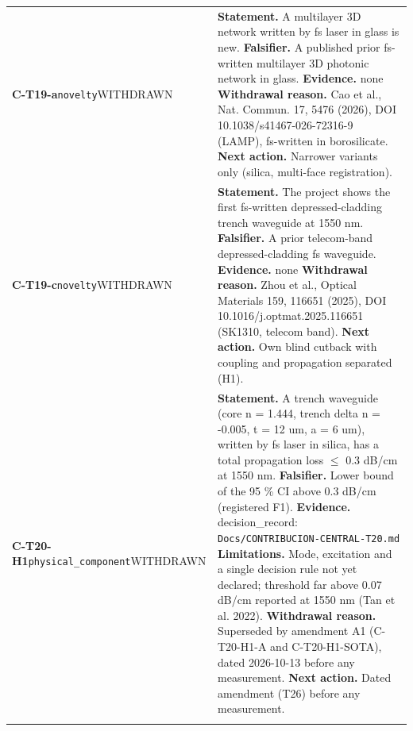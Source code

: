 \begin{longtable}{@{}>{\raggedright\arraybackslash}p{2.35cm}>{\raggedright\arraybackslash}p{13.2cm}@{}}
\textbf{C-T19-a}\newline \texttt{novelty}\newline WITHDRAWN & \textbf{Statement.} A multilayer 3D network written by fs laser in glass is new. \newline \textbf{Falsifier.} A published prior fs-written multilayer 3D photonic network in glass. \newline \textbf{Evidence.} none \newline \textbf{Withdrawal reason.} Cao et al., Nat. Commun. 17, 5476 (2026), DOI 10.1038/\allowbreak{}s41467-026-72316-9 (LAMP), fs-written in borosilicate. \newline \textbf{Next action.} Narrower variants only (silica, multi-face registration). \\ \addlinespace[2pt]
\textbf{C-T19-c}\newline \texttt{novelty}\newline WITHDRAWN & \textbf{Statement.} The project shows the first fs-written depressed-cladding trench waveguide at 1550 nm. \newline \textbf{Falsifier.} A prior telecom-band depressed-cladding fs waveguide. \newline \textbf{Evidence.} none \newline \textbf{Withdrawal reason.} Zhou et al., Optical Materials 159, 116651 (2025), DOI 10.1016/\allowbreak{}j.optmat.2025.116651 (SK1310, telecom band). \newline \textbf{Next action.} Own blind cutback with coupling and propagation separated (H1). \\ \addlinespace[2pt]
\textbf{C-T20-H1}\newline \texttt{physical\_\allowbreak{}component}\newline WITHDRAWN & \textbf{Statement.} A trench waveguide (core n = 1.444, trench delta n = -0.005, t = 12 um, a = 6 um), written by fs laser in silica, has a total propagation loss $\le$ 0.3 dB/\allowbreak{}cm at 1550 nm. \newline \textbf{Falsifier.} Lower bound of the 95 \% CI above 0.3 dB/\allowbreak{}cm (registered F1). \newline \textbf{Evidence.} decision\_\allowbreak{}record: \texttt{Docs/\allowbreak{}CONTRIBUCION-CENTRAL-T20.md} \newline \textbf{Limitations.} Mode, excitation and a single decision rule not yet declared; threshold far above 0.07 dB/\allowbreak{}cm reported at 1550 nm (Tan et al. 2022). \newline \textbf{Withdrawal reason.} Superseded by amendment A1 (C-T20-H1-A and C-T20-H1-SOTA), dated 2026-10-13 before any measurement. \newline \textbf{Next action.} Dated amendment (T26) before any measurement. \\ \addlinespace[2pt]

\end{longtable}
